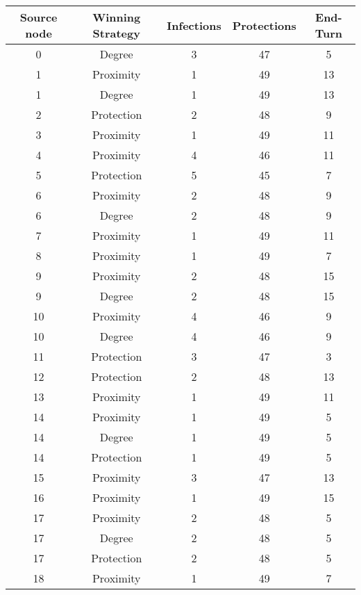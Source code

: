 \documentclass[results.tex]{subfiles}
\begin{document}
\begin{center}
  \begin{tabular}{| c || c | c | c | c |}
    \hline
    {\bfseries Source node} & {\bfseries Winning Strategy} & {\bfseries Infections} & {\bfseries Protections} & {\bfseries End-Turn} \\  %
    \hline\hline
    0 & Degree & 3 & 47 & 5 \\ 
    \hline
    1 & Proximity & 1 & 49 & 13 \\ 
    \hline
    1 & Degree & 1 & 49 & 13 \\ 
    \hline
    2 & Protection & 2 & 48 & 9 \\ 
    \hline
    3 & Proximity & 1 & 49 & 11 \\ 
    \hline
    4 & Proximity & 4 & 46 & 11 \\ 
    \hline
    5 & Protection & 5 & 45 & 7 \\ 
    \hline
    6 & Proximity & 2 & 48 & 9 \\ 
    \hline
    6 & Degree & 2 & 48 & 9 \\ 
    \hline
    7 & Proximity & 1 & 49 & 11 \\ 
    \hline
    8 & Proximity & 1 & 49 & 7 \\ 
    \hline
    9 & Proximity & 2 & 48 & 15 \\ 
    \hline
    9 & Degree & 2 & 48 & 15 \\ 
    \hline
    10 & Proximity & 4 & 46 & 9 \\ 
    \hline
    10 & Degree & 4 & 46 & 9 \\ 
    \hline
    11 & Protection & 3 & 47 & 3 \\ 
    \hline
    12 & Protection & 2 & 48 & 13 \\ 
    \hline
    13 & Proximity & 1 & 49 & 11 \\ 
    \hline
    14 & Proximity & 1 & 49 & 5 \\ 
    \hline
    14 & Degree & 1 & 49 & 5 \\ 
    \hline
    14 & Protection & 1 & 49 & 5 \\ 
    \hline
    15 & Proximity & 3 & 47 & 13 \\ 
    \hline
    16 & Proximity & 1 & 49 & 15 \\ 
    \hline
    17 & Proximity & 2 & 48 & 5 \\ 
    \hline
    17 & Degree & 2 & 48 & 5 \\ 
    \hline
    17 & Protection & 2 & 48 & 5 \\ 
    \hline
    18 & Proximity & 1 & 49 & 7 \\ 

\end{tabular}
\end{center}
\end{document}
